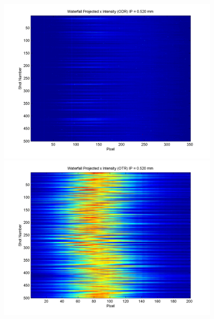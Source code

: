 \documentclass[12pt]{article}
\begin{document}
\begin{figure}
\begin{center}
\includegraphics[scale=0.5]{Figures/ProjX_wfall_ODR_520.PNG}
\includegraphics[scale=0.5]{Figures/ProjX_wfall_OTR_520.PNG}
\caption{}
\end{center}
\end{figure}
\end{document}
